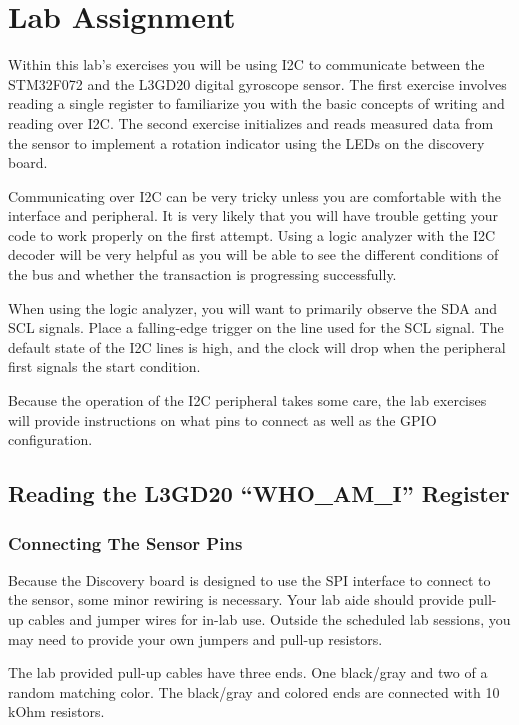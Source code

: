 \documentclass[11pt,fleqn]{book} %
\begin{document}
\section{Lab Assignment}
Within this lab's exercises you will be using I2C to communicate between the STM32F072 and the L3GD20 digital gyroscope sensor. The first exercise involves reading a single register to familiarize you with the basic concepts of writing and reading over I2C. The second exercise initializes and reads measured data from the sensor to  implement a rotation indicator using the LEDs on the discovery board. 

Communicating over I2C can be very tricky unless you are comfortable with the interface and peripheral. It is very likely that you will have trouble getting your code to work properly on the first attempt. Using a logic analyzer with the I2C decoder will be very helpful as you will be able to see the different conditions of the bus and whether the transaction is progressing successfully. 

When using the logic analyzer, you will want to primarily observe the SDA and SCL signals. Place a falling-edge trigger on the line used for the SCL signal. The default state of the I2C lines is high, and the clock will drop when the peripheral first signals the start condition.  

Because the operation of the I2C peripheral takes some care, the lab exercises will provide instructions on what pins to connect as well as the GPIO configuration. 

\subsection{Reading the L3GD20 ``WHO\_AM\_I'' Register}
\subsubsection{Connecting The Sensor Pins}
Because the Discovery board is designed to use the SPI interface to connect to the sensor, some minor rewiring is necessary. Your lab aide should provide pull-up cables and jumper wires for in-lab use. Outside the scheduled lab sessions, you may need to provide your own jumpers and pull-up resistors. 

The lab provided pull-up cables have three ends. One black/gray and two of a random matching color. The black/gray and colored ends are connected with 10 kOhm resistors. 
\end{document}
